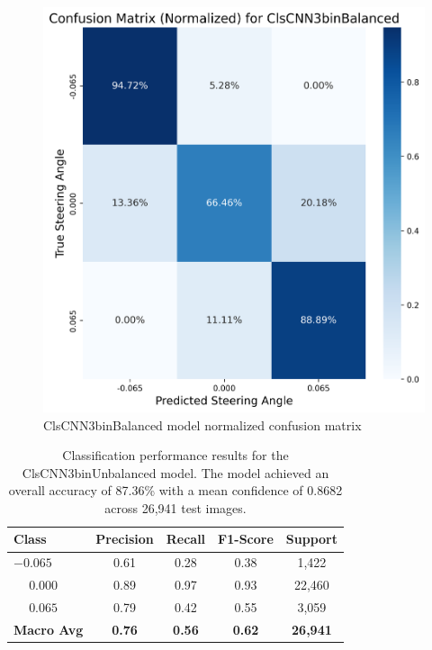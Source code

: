\begin{figure}[H]
\centering
\includegraphics[width=0.65\linewidth]{Figures/Results/cm_norm_ClsCNN3binBalanced.png}
\caption{ClsCNN3binBalanced model normalized confusion matrix}
\label{fig:cm_norm_ClsCNN3binBalanced}
\end{figure}


\begin{table}[htbp]
\centering
\begin{tabular}{@{}lcccc@{}}
\toprule
\textbf{Class} & \textbf{Precision} & \textbf{Recall} & \textbf{F1-Score} & \textbf{Support} \\
\midrule
$-0.065$ & 0.61 & 0.28 & 0.38 & 1,422 \\
$\phantom{-}0.000$ & 0.89 & 0.97 & 0.93 & 22,460 \\
$\phantom{-}0.065$ & 0.79 & 0.42 & 0.55 & 3,059 \\
\midrule
\textbf{Macro Avg} & \textbf{0.76} & \textbf{0.56} & \textbf{0.62} & \textbf{26,941} \\
\bottomrule
\end{tabular}
\caption{Classification performance results for the ClsCNN3binUnbalanced model. The model achieved an overall accuracy of 87.36\% with a mean confidence of 0.8682 across 26,941 test images.}
\label{tab:clf_report_ClsCNN3binUnbalanced}
\end{table}


